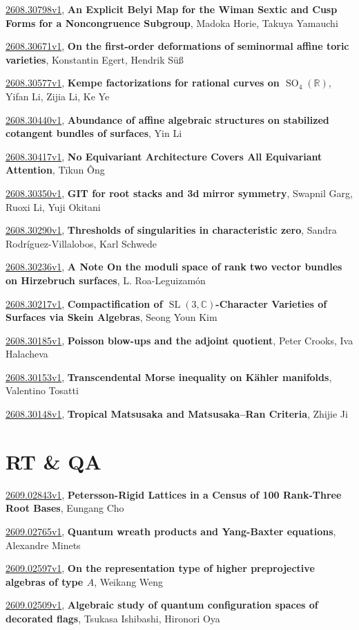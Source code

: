 \documentclass[9pt, a4paper]{article}
\theoremstyle{plain}
\theoremstyle{definition}
\theoremstyle{remark}
\newcommand{\arxiv}[3]{\href{https://arxiv.org/abs/#1}{#1}, \textbf{\textcolor{arxivblue}{#2}}, #3}
\begin{document}
\arxiv{2608.30798v1}{An Explicit Belyi Map for the Wiman Sextic and Cusp Forms for a Noncongruence Subgroup}{Madoka Horie, Takuya Yamauchi}

\arxiv{2608.30671v1}{On the first-order deformations of seminormal affine toric varieties}{Konstantin Egert, Hendrik Süß}

\arxiv{2608.30577v1}{Kempe factorizations for rational curves on $\operatorname{SO}_4(\mathbb{R})$}{Yifan Li, Zijia Li, Ke Ye}

\arxiv{2608.30440v1}{Abundance of affine algebraic structures on stabilized cotangent bundles of surfaces}{Yin Li}

\arxiv{2608.30417v1}{No Equivariant Architecture Covers All Equivariant Attention}{Tīkun Ông}

\arxiv{2608.30350v1}{GIT for root stacks and 3d mirror symmetry}{Swapnil Garg, Ruoxi Li, Yuji Okitani}

\arxiv{2608.30290v1}{Thresholds of singularities in characteristic zero}{Sandra Rodríguez-Villalobos, Karl Schwede}

\arxiv{2608.30236v1}{A Note On the moduli space of rank two vector bundles on Hirzebruch surfaces}{L. Roa-Leguizamón}

\arxiv{2608.30217v1}{Compactification of $\operatorname{SL}(3,\mathbb{C})$-Character Varieties of Surfaces via Skein Algebras}{Seong Youn Kim}

\arxiv{2608.30185v1}{Poisson blow-ups and the adjoint quotient}{Peter Crooks, Iva Halacheva}

\arxiv{2608.30153v1}{Transcendental Morse inequality on Kähler manifolds}{Valentino Tosatti}

\arxiv{2608.30148v1}{Tropical Matsusaka and Matsusaka--Ran Criteria}{Zhijie Ji}


\section{RT \& QA}
\arxiv{2609.02843v1}{Petersson-Rigid Lattices in a Census of 100 Rank-Three Root Bases}{Eungang Cho}

\arxiv{2609.02765v1}{Quantum wreath products and Yang-Baxter equations}{Alexandre Minets}

\arxiv{2609.02597v1}{On the representation type of higher preprojective algebras of type $A$}{Weikang Weng}

\arxiv{2609.02509v1}{Algebraic study of quantum configuration spaces of decorated flags}{Tsukasa Ishibashi, Hironori Oya}
\end{document}
